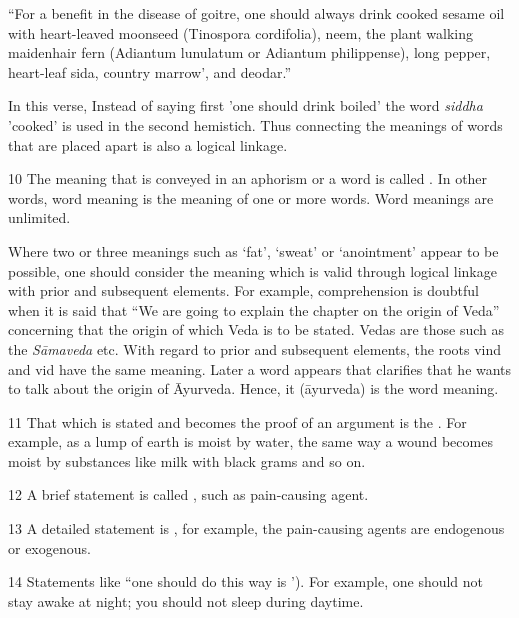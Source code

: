 \begin{translation}
        ``For a benefit in the disease of goitre, one should always drink cooked sesame oil with heart-leaved moonseed (Tinospora cordifolia), neem, the plant walking maidenhair fern (Adiantum lunulatum or Adiantum philippense), long pepper, heart-leaf sida, country marrow', and deodar.'' 
    
    In this verse, Instead of saying first  'one should drink boiled' the word \emph{siddha} 'cooked' is used in the second hemistich. Thus connecting the meanings of words that are placed apart is also a logical linkage.  
     
    
    \item [10] The meaning that is conveyed in an aphorism or a word is called . In other words, word meaning is the meaning of one or more words. Word meanings are unlimited. 
    
   Where two or three meanings such as ‘fat’, ‘sweat’ or ‘anointment’ appear to be possible, one should consider the meaning which is valid through logical linkage with prior and subsequent elements. For example, comprehension is doubtful when it is said that “We are going to explain the chapter on the origin of Veda” concerning that the origin of which Veda is to be stated. Vedas are those such as the \emph{Sāmaveda} etc. With regard to prior and subsequent elements, the roots vind and vid have the same meaning. Later a word appears that clarifies that he wants to talk about the origin of Āyurveda. Hence, it (āyurveda) is the word meaning.  
    
    \item [11] That which is stated and becomes the proof of an argument is the . For example, as a lump of earth is moist by water, the same way a wound becomes moist by substances like milk with black grams and so on.  
    
    \item [12] A brief statement is called , such as  {pain-causing agent}. 
    
    \item [13] A detailed statement is , for example, the pain-causing agents are endogenous or exogenous. 
    
    \item [14] Statements like ``one should do this way is '). For example, one should not stay awake at night; you should not sleep during daytime.      
    
    
    
\end{translation}
